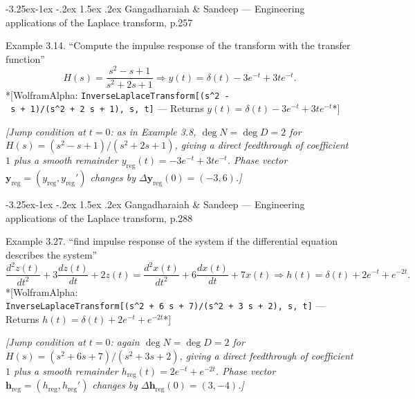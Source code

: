 \documentclass[
  11pt,
]{article}
\makeatletter
\providecommand{\implies}{\Longrightarrow}
\renewcommand\paragraph{\@startsection{paragraph}{4}{\z@}%
                                     {-3.25ex\@plus -1ex \@minus -.2ex}%
                                     {1.5ex \@plus .2ex}%
                                     {\normalfont\normalsize\bfseries}}
\makeatother
\begin{document}
\hypertarget{gangadharaiah-sandeep-engineering-applications-of-the-laplace-transform-p.257}{%
\paragraph{Gangadharaiah \& Sandeep --- Engineering applications of the
Laplace transform,
p.257}\label{gangadharaiah-sandeep-engineering-applications-of-the-laplace-transform-p.257}}

Example 3.14. ``Compute the impulse response of the transform with the
transfer function'' \[
H(s) = \frac{s^2 - s + 1}{s^2 + 2s + 1} \implies y(t) = \delta(t) - 3e^{-t} + 3te^{-t}.
\] *{[}WolframAlpha:
\texttt{InverseLaplaceTransform{[}(s\^{}2\ -\ s\ +\ 1)/(s\^{}2\ +\ 2\ s\ +\ 1),\ s,\ t{]}}
--- Returns \(y(t) = \delta(t) - 3 e^{-t} + 3 t e^{-t}\)*{]}

\emph{{[}Jump condition at \(t=0\): as in Example 3.8,
\(\deg N=\deg D=2\) for \(H(s)=(s^2-s+1)/(s^2+2s+1)\), giving a direct
feedthrough of coefficient \(1\) plus a smooth remainder
\(y_{\text{reg}}(t)=-3e^{-t}+3te^{-t}\). Phase vector
\(\mathbf y_{\text{reg}}=(y_{\text{reg}},y_{\text{reg}}')\) changes by
\(\Delta\mathbf y_{\text{reg}}(0)=(-3,6)\).{]}}

\hypertarget{gangadharaiah-sandeep-engineering-applications-of-the-laplace-transform-p.288}{%
\paragraph{Gangadharaiah \& Sandeep --- Engineering applications of the
Laplace transform,
p.288}\label{gangadharaiah-sandeep-engineering-applications-of-the-laplace-transform-p.288}}

Example 3.27. ``find impulse response of the system if the differential
equation describes the system'' \[
\frac{d^2z(t)}{dt^2} + 3\frac{dz(t)}{dt} + 2z(t) = \frac{d^2x(t)}{dt^2} + 6\frac{dx(t)}{dt} + 7x(t) \implies h(t) = \delta(t) + 2e^{-t} + e^{-2t}.
\] *{[}WolframAlpha:
\texttt{InverseLaplaceTransform{[}(s\^{}2\ +\ 6\ s\ +\ 7)/(s\^{}2\ +\ 3\ s\ +\ 2),\ s,\ t{]}}
--- Returns \(h(t) = \delta(t) + 2 e^{-t} + e^{-2t}\)*{]}

\emph{{[}Jump condition at \(t=0\): again \(\deg N=\deg D=2\) for
\(H(s)=(s^2+6s+7)/(s^2+3s+2)\), giving a direct feedthrough of
coefficient \(1\) plus a smooth remainder
\(h_{\text{reg}}(t)=2e^{-t}+e^{-2t}\). Phase vector
\(\mathbf h_{\text{reg}}=(h_{\text{reg}},h_{\text{reg}}')\) changes by
\(\Delta\mathbf h_{\text{reg}}(0)=(3,-4)\).{]}}
\end{document}
